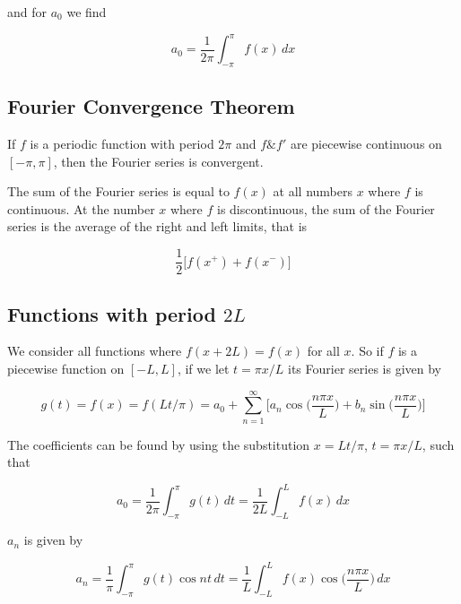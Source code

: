 \documentclass[a4paper]{article}
\begin{document}
and for $a_0$ we find

\begin{equation*}
    a_0=\frac{1}{2\pi}\int_{-\pi}^{\pi}f(x)\,dx
\end{equation*}

\subsection{Fourier Convergence Theorem}

If $f$ is a periodic function with period $2\pi$ and $f\&f'$ are piecewise continuous on $[-\pi, \pi]$, then the Fourier series is convergent.

\bigskip

The sum of the Fourier series is equal to $f(x)$ at all numbers $x$ where $f$ is continuous. At the number $x$ where $f$ is discontinuous, the sum of the Fourier series is the average of the right and left limits, that is

\begin{equation*}
    \frac{1}{2}\Big[f(x^{+})+f(x^{-})\Big]
\end{equation*}

\subsection{Functions with period $2L$}

We consider all functions where $f(x+2L)=f(x)$ for all $x$. So if $f$ is a piecewise function on $[-L, L]$, if we let $t=\pi x/L$ its Fourier series is given by

\begin{equation*}
    g(t)=f(x)=f(Lt/\pi)=a_0+\sum_{n=1}^{\infty}\bigg[a_n\cos\bigg(\frac{n\pi x}{L}\bigg)+b_n\sin\bigg(\frac{n\pi x}{L}\bigg)\bigg]
\end{equation*}

The coefficients can be found by using the substitution $x=Lt/\pi$, $t=\pi x/L$, such that

\begin{equation*}
    a_0=\frac{1}{2\pi}\int_{-\pi}^{\pi}g(t)\,dt=\frac{1}{2L}\int_{-L}^{L}f(x)\,dx
\end{equation*}

$a_n$ is given by

\begin{equation*}
    a_n=\frac{1}{\pi}\int_{-\pi}^{\pi}g(t)\cos nt\,dt=\frac{1}{L}\int_{-L}^{L}f(x)\cos\bigg(\frac{n\pi x}{L}\bigg)\,dx
\end{equation*}
\end{document}
